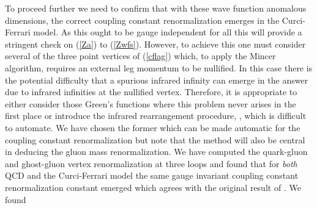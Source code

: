 \documentclass[a4paper,11pt]{article}
\begin{document}
To proceed further we need to confirm that with these wave function anomalous
dimensions, the correct coupling constant renormalization emerges in the
Curci-Ferrari model. As this ought to be gauge independent for all \myHighlight{$\alpha$}\coordHE{}
this will provide a stringent check on (\ref{Za}) to (\ref{Zwfs}). However, to 
achieve this one must consider several of the three point vertices of 
(\ref{cflag}) which, to apply the {\sc Mincer} algorithm, requires an external 
leg momentum to be nullified. In this case there is the potential difficulty 
that a spurious infrared infinity can emerge in the answer due to infrared 
infinities at the nullified vertex. Therefore, it is appropriate to either 
consider those Green's functions where this problem never arises in the first 
place or introduce the infrared rearrangement procedure, \cite{41,42}, which is
difficult to automate. We have chosen the former which can be made automatic 
for the coupling constant renormalization but note that the method will also be
central in deducing the gluon mass renormalization. We have computed the 
quark-gluon and ghost-gluon vertex renormalization at three loops and found 
that for {\em both} QCD and the Curci-Ferrari model the same gauge invariant 
coupling constant renormalization constant emerged which agrees with the 
original result of \cite{43}. We found  
\end{document}
